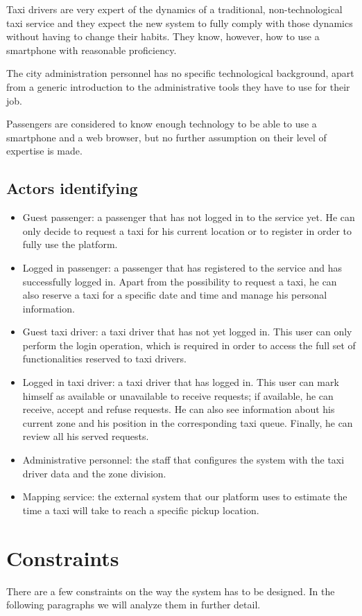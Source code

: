 Taxi drivers are very expert of the dynamics of a traditional, non-technological taxi service and they expect the new system to fully comply with those dynamics without having to change their habits. They know, however, how to use a smartphone with reasonable proficiency.

The city administration personnel has no specific technological background, apart from a generic introduction to the administrative tools they have to use for their job.

Passengers are considered to know enough technology to be able to use a smartphone and a web browser, but no further assumption on their level of expertise is made. 


\subsection{Actors identifying}
\begin{itemize}
\item Guest passenger: a passenger that has not logged in to the service yet. He can only decide to request a taxi for his current location or to register in order to fully use the platform. 
\item Logged in passenger: a passenger that has registered to the service and has successfully logged in. Apart from the possibility to request a taxi, he can also reserve a taxi for a specific date and time and manage his personal information.
\item Guest taxi driver: a taxi driver that has not yet logged in. This user can only perform the login operation, which is required in order to access the full set of functionalities reserved to taxi drivers. 
\item Logged in taxi driver: a taxi driver that has logged in. This user can mark himself as available or unavailable to receive requests; if available, he can receive, accept and refuse requests. He can also see information about his current zone and his position in the corresponding taxi queue. Finally, he can review all his served requests.
\item Administrative personnel: the staff that configures the system with the taxi driver data and the zone division. 
\item Mapping service: the external system that our platform uses to estimate the time a taxi will take to reach a specific pickup location.
\end{itemize}


\section{Constraints}
There are a few constraints on the way the system has to be designed. In the following paragraphs we will analyze them in further detail.


